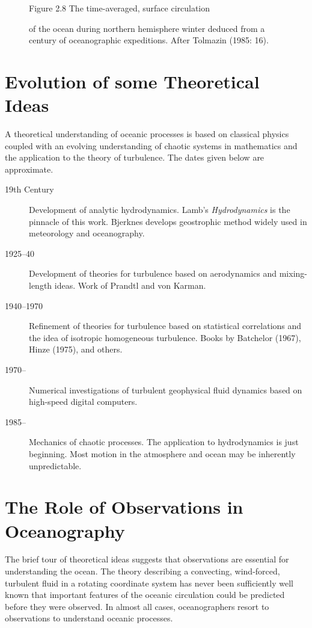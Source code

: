 \begin{figure}[t!]
\centering
\footnotesize
Figure 2.8 The time-averaged, surface circulation \rule{0mm}{3ex}of the ocean during
northern hemisphere winter deduced from a century of oceanographic expeditions. After
Tolmazin (1985: 16).

\label{fig:Fig2-8}
\vspace{-3ex}
\end{figure}

\section{Evolution of some Theoretical Ideas}
A theoretical understanding of oceanic processes is based on classical physics
coupled with an evolving understanding of chaotic systems in mathematics and the
application to the theory of turbulence. The dates given below are
approximate.
\vspace{-1.0ex}
\begin{description}
\item[19th Century] Development of analytic hydrodynamics. Lamb's
\textit{Hydrodynamics} is the pinnacle of this work. Bjerknes develops
geostrophic method widely used in meteorology and oceanography.
\vspace{-1.0ex}
\item[1925--40] Development of theories for turbulence based on aerodynamics and
mixing-length ideas. Work of Prandtl and von Karman.
\vspace{-1.0ex}
\item[1940--1970]   Refinement of theories for turbulence based on
statistical correlations and the idea of isotropic homogeneous turbulence. Books by
Batchelor (1967), Hinze (1975), and others.
\vspace{-1.0ex}
\item[1970--]   Numerical investigations of turbulent geophysical fluid dynamics
based on high-speed digital computers.
\vspace{-1.0ex}
\item[1985--]   Mechanics of chaotic processes. The application to hydrodynamics
is just beginning. Most motion in the atmosphere and ocean may be inherently
unpredictable.
\end{description}

\section{The Role of Observations in Oceanography}
The brief tour of theoretical ideas suggests
that observations are essential for understanding the ocean. The
theory describing a convecting, wind-forced, tur\-bulent fluid in
a rotating coordinate system has never been sufficiently well
known that important features of the oceanic circulation could be
predicted before they were observed. In almost all cases,
oceanographers resort to observations to understand oceanic
processes.

